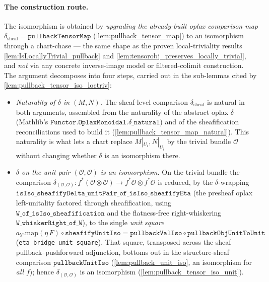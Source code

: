 \paragraph{The construction route.} The isomorphism is obtained by \emph{upgrading
the already-built oplax comparison map} \(\delta_{\mathrm{sheaf}} =
\mathtt{pullbackTensorMap}\) (\cref{lem:pullback_tensor_map}) to an isomorphism
through a chart-chase --- the same shape as the proven local-triviality results
\cref{lem:IsLocallyTrivial_pullback} and
\cref{lem:tensorobj_preserves_locally_trivial}, and \emph{not} via any concrete
inverse-image model or filtered-colimit construction. The argument decomposes into
four steps, carried out in the sub-lemmas cited by
\cref{lem:pullback_tensor_iso_loctriv}:
\begin{itemize}
  \item[(D1$'$)] \emph{Naturality of \(\delta\) in \((M,N)\).} The sheaf-level
    comparison \(\delta_{\mathrm{sheaf}}\) is natural in both arguments, assembled from
    the naturality of the abstract oplax \(\delta\) (Mathlib's
    \(\mathtt{Functor.OplaxMonoidal.}\delta\mathtt{\_natural}\)) and of the
    sheafification reconciliations used to build it
    (\cref{lem:pullback_tensor_map_natural}). This naturality is what lets a chart
    replace \(M|_{U_i}, N|_{U_i}\) by the trivial bundle \(\mathcal{O}\) without
    changing whether \(\delta\) is an isomorphism there.
  \item[(D2$'$)] \emph{\(\delta\) on the unit pair \((\mathcal{O},\mathcal{O})\) is an
    isomorphism.} On the trivial bundle the comparison
    \(\delta_{(\mathcal{O},\mathcal{O})} : f^*(\mathcal{O} \otimes \mathcal{O}) \to
    f^*\mathcal{O} \otimes f^*\mathcal{O}\) is reduced, by the \(\delta\)-wrapping
    \(\mathtt{isIso\_sheafifyDelta\_unitPair\_of\_isIso\_sheafifyEta}\) (the presheaf
    oplax left-unitality factored through sheafification, using
    \(\mathtt{W\_of\_isIso\_sheafification}\) and the flatness-free right-whiskering
    \(\mathtt{W\_whiskerRight\_of\_W}\)), to the single \emph{unit square}
    \(a_Y.\mathrm{map}(\eta\,F) \circ \mathtt{sheafifyUnitIso} = \mathtt{pullbackValIso}
    \circ \mathtt{pullbackObjUnitToUnit}\) (\texttt{eta\_bridge\_unit\_square}). That
    square, transposed across the sheaf pullback--pushforward adjunction, bottoms out in
    the structure-sheaf comparison \(\mathtt{pullbackUnitIso}\)
    (\cref{lem:pullback_unit_iso}, an isomorphism for \emph{all} \(f\)); hence
    \(\delta_{(\mathcal{O},\mathcal{O})}\) is an isomorphism
    (\cref{lem:pullback_tensor_iso_unit}).

\end{itemize}
